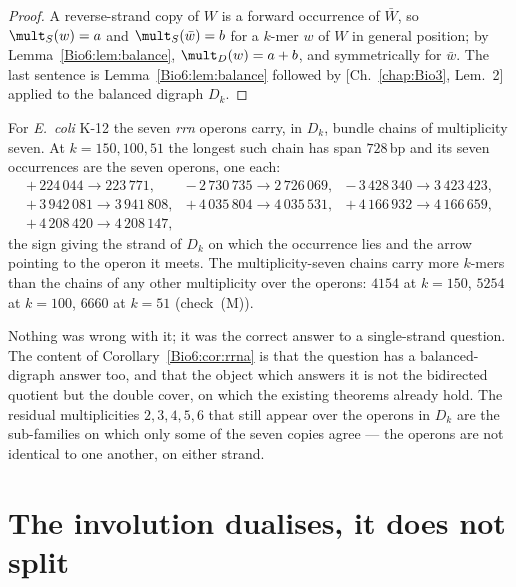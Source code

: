 \begin{proof}
A reverse-strand copy of $W$ is a forward occurrence of $\bar W$, so
$\mult_S(w)=a$ and $\mult_S(\bar w)=b$ for a $k$-mer $w$ of $W$ in general position; by
Lemma~\ref{Bio6:lem:balance}, $\mult_D(w)=a+b$, and symmetrically for $\bar w$. The last
sentence is Lemma~\ref{Bio6:lem:balance} followed by [Ch.~\ref{chap:Bio3}, Lem.~2] applied to the
balanced digraph $D_k$.
\end{proof}

\begin{corollary}\label{Bio6:cor:rrna}
For \emph{E.\ coli} K-12 the seven \emph{rrn} operons carry, in $D_k$, bundle chains of
multiplicity seven. At $k=150,100,51$ the longest such chain has span $728$\,bp and its
seven occurrences are the seven operons, one each:
\[
\begin{array}{lll}
+\,224\,044\to223\,771, & -\,2\,730\,735\to2\,726\,069, & -\,3\,428\,340\to3\,423\,423,\\
+\,3\,942\,081\to3\,941\,808, & +\,4\,035\,804\to4\,035\,531, & +\,4\,166\,932\to4\,166\,659,\\
+\,4\,208\,420\to4\,208\,147, & &
\end{array}
\]
the sign giving the strand of $D_k$ on which the occurrence lies and the arrow pointing to
the operon it meets. The multiplicity-seven chains carry more $k$-mers than the chains of
any other multiplicity over the operons: $4154$ at $k=150$, $5254$ at $k=100$, $6660$ at
$k=51$ (check~(M)).
\end{corollary}

\begin{remark}\label{Bio6:rem:52}
Nothing was wrong with it; it was the correct answer to a single-strand question. The
content of Corollary~\ref{Bio6:cor:rrna} is that the question has a balanced-digraph answer
too, and that the object which answers it is not the bidirected quotient but the double
cover, on which the existing theorems already hold. The residual multiplicities
$2,3,4,5,6$ that still appear over the operons in $D_k$ are the sub-families on which only
some of the seven copies agree --- the operons are not identical to one another, on either
strand.
\end{remark}

\section{The involution dualises, it does not split}\label{Bio6:sec:rho}

